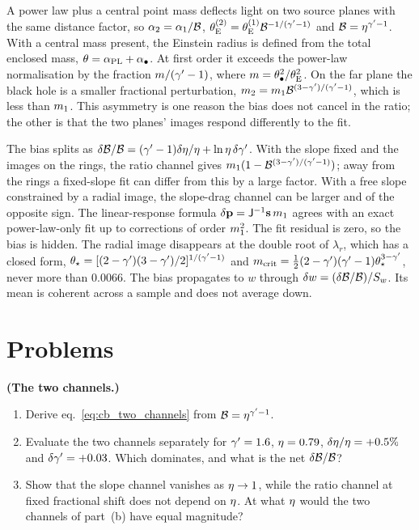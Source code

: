 A power law plus a central point mass deflects light on two source
planes with the same distance factor, so $\alpha_2=\alpha_1/\mathcal{B}$,
$\theta_{\mathrm{E}}^{(2)}=\theta_{\mathrm{E}}^{(1)}\mathcal{B}^{-1/(\gamma'-1)}$ and
$\mathcal{B}=\eta^{\gamma'-1}$. With a central mass present, the Einstein
radius is defined from the total enclosed mass,
$\theta=\alpha_{\rm PL}+\alpha_\bullet$. At first order it exceeds the
power-law normalisation by the fraction $m/(\gamma'-1)$, where
$m=\theta_{\bullet}^2/\theta_{\mathrm{E}}^2$. On the far plane the black hole is a
smaller fractional perturbation, $m_2=m_1\mathcal{B}^{(3-\gamma')/(\gamma'-1)}$,
which is less than $m_1$. This asymmetry is one reason the bias does
not cancel in the ratio; the other is that the two planes' images
respond differently to the fit.

The bias splits as
$\delta\mathcal{B}/\mathcal{B}=(\gamma'-1)\delta\eta/\eta+\ln\eta\,\delta\gamma'$.
With the slope fixed and the images on the rings, the ratio channel
gives $m_1(1-\mathcal{B}^{(3-\gamma')/(\gamma'-1)})$; away from the rings a
fixed-slope fit can differ from this by a large factor. With a free
slope constrained by a radial image, the slope-drag channel can be
larger and of the opposite sign. The linear-response formula
$\delta\mathbf{p}=\mathsf{J}^{-1}\mathbf{s}\,m_1$ agrees with an
exact power-law-only fit up to corrections of order $m_1^2$. The fit
residual is zero, so the bias is hidden. The radial image disappears at
the double root of $\lambda_r$, which has a closed form,
$\theta_\star=[(2-\gamma')(3-\gamma')/2]^{1/(\gamma'-1)}$ and
$m_{\rm crit}=\tfrac12(2-\gamma')(\gamma'-1)\theta_\star^{3-\gamma'}$, never more
than $0.0066$. The bias propagates to $w$ through
$\delta w=(\delta\mathcal{B}/\mathcal{B})/S_w$. Its mean is coherent across a sample
and does not average down.


\section{Problems}
\label{sec:cb_problems}

\begin{exercise}
\label{ex:cb_two_channels}
\textbf{(The two channels.)}
\begin{enumerate}[label=(\alph*)]
  \item Derive eq.~\eqref{eq:cb_two_channels} from $\mathcal{B}=\eta^{\gamma'-1}$.
  \item Evaluate the two channels separately for $\gamma'=1.6$,
        $\eta=0.79$, $\delta\eta/\eta=+0.5\%$ and
        $\delta\gamma'=+0.03$. Which dominates, and what is the net
        $\delta\mathcal{B}/\mathcal{B}$?
  \item Show that the slope channel vanishes as $\eta\to1$, while the
        ratio channel at fixed fractional shift does not depend on
        $\eta$. At what $\eta$ would the two channels of part~(b)
        have equal magnitude?
\end{enumerate}
\end{exercise}

